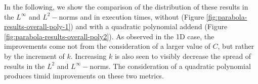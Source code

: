 \documentclass[12pt]{report} %
\begin{document}
In the following, we show the comparison of the distribution of these results in the $L^\infty$ and $L^2-$norms and in execution times, without (Figure \ref{fig:parabola-results-overall-poly-1}) and with a quadratic polynomial addend (Figure \ref{fig:parabola-results-overall-poly2}). As observed in the 1D case, the improvements come not from the consideration of a larger value of $C$, but rather by the increment of $k$. Increasing $k$ is also seen to visibly decrease the spread of results in the $L^2$ and $L^\infty-$norms. The consideration of a quadratic polynomial produces timid improvements on these two metrics. %
\clearpage
\begin{figure}
  \hspace*{-1cm}
  \begin{tabular}{cccccc}

\end{tabular}
\end{figure}
\end{document}
